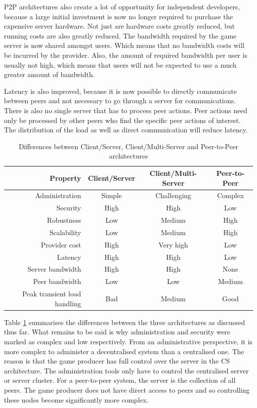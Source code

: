 \documentclass[journal,oneside,a4paper,onecolumn]{IEEEtran}
\begin{document}
\ac{P2P} architectures also create a lot of opportunity for independent developers, because a large initial investment is now no longer required to purchase the expensive server hardware. Not just are hardware costs greatly reduced, but running costs are also greatly reduced. The bandwidth required by the game server is now shared amongst users. Which means that no bandwidth costs will be incurred by the provider. Also, the amount of required bandwidth per user is usually not high, which means that users will not be expected to use a much greater amount of bandwidth.

Latency is also improved, because it is now possible to directly communicate between peers and not necessary to go through a server for communications. There is also no single server that has to process peer actions. Peer actions need only be processed by other peers who find the specific peer actions of interest. The distribution of the load as well as direct communication will reduce latency.

\begin{table}[htbp]
\centering
\begin{tabular}{|r|c|c|c|}
\hline
Property & Client/Server & Client/Multi-Server & Peer-to-Peer\\
\hline
Administration & Simple & Challenging & Complex\\
Security & High & High & Low\\
Robustness & Low & Medium & High\\
Scalability & Low & Medium & High\\
Provider cost & High & Very high & Low\\
Latency & High & High & Low\\
Server bandwidth & High & High & None\\
Peer bandwidth & Low & Low & Medium\\
Peak transient load handling & Bad & Medium & Good\\
\hline
\end{tabular}
\caption{Differences between Client/Server, Client/Multi-Server and Peer-to-Peer architectures}
\label{tab_archs}
\end{table}

Table \ref{tab_archs} summarises the differences between the three architectures as discussed thus far. What remains to be said is why administration and security were marked as complex and low respectively. From an administrative perspective, it is more complex to administer a decentralised system than a centralised one. The reason is that the game producer has full control over the server in the \ac{CS} architecture. The administration tools only have to control the centralised server or server cluster. For a peer-to-peer system, the server is the collection of all peers. The game producer does not have direct access to peers and so controlling these nodes become significantly more complex.
\end{document}
